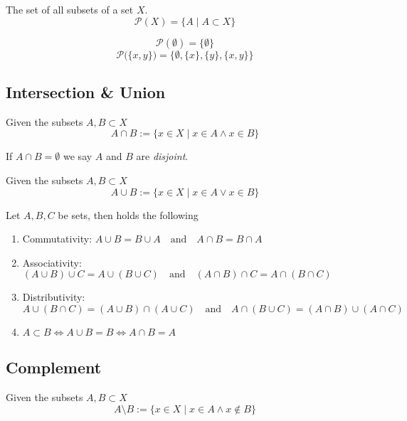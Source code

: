 \begin{definition}[Powerset]
   The set of all subsets of a set \(X\).
   \[\mathcal{P}(X) = \{A \mid A \subset X\}\]
\end{definition}
\begin{example}
   \[\mathcal{P}(\emptyset) = \{\emptyset\}\]
   \[\mathcal{P}\big(\{x, y\}\big) = \big\{\emptyset, \{x\}, \{y\}, \{x, y\}\big\}\]
\end{example}

\subsection{Intersection \& Union}
\begin{definition}[Intersection]
   Given the subsets \(A, B \subset X\)
   \[A \cap B := \{x \in X \mid x \in A \land x \in B\}\]
\end{definition}
\begin{remark}
   If \(A \cap B = \emptyset\) we say \(A\) and \(B\) are \textit{disjoint}.
\end{remark}

\begin{definition}[Union]
   Given the subsets \(A, B \subset X\)
   \[A \cup B := \{x \in X \mid x \in A \lor x \in B\}\]
\end{definition}

\begin{proposition}
   Let \(A, B, C\) be sets, then holds the following
   \begin{enumerate}[label=\roman*, align=Center]
      \item Commutativity: \(A \cup B = B \cup A \quad\text{and}\quad A \cap B = B \cap A\)
      \item Associativity: \((A \cup B) \cup C = A \cup (B \cup C) \quad\text{and}\quad (A \cap B) \cap C = A \cap (B \cap C)\)
      \item Distributivity: \(A \cup (B \cap C) = (A \cup B) \cap (A \cup C) \quad\text{and}\quad A \cap (B \cup C) = (A \cap B) \cup (A \cap C)\)
      \item \(A \subset B \iff A \cup B = B \iff A \cap B = A\)
   \end{enumerate}
\end{proposition}

\subsection{Complement}
\begin{definition}
   Given the subsets \(A, B \subset X\)
   \[A \setminus B := \{x \in X \mid x \in A \land x \notin B\}\]
\end{definition}

